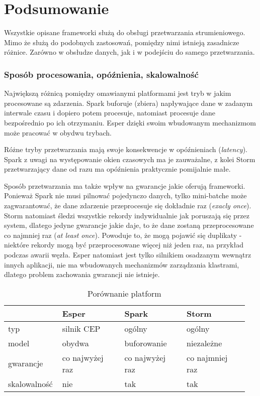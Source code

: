 \section{Podsumowanie}

Wszystkie opisane frameworki służą do obsługi przetwarzania strumieniowego.
Mimo że służą do podobnych zastosowań,
pomiędzy nimi istnieją zasadnicze różnice.
Zarówno w obsłudze danych,
jak i w podejściu do samego przetwarzania.

\subsubsection*{Sposób procesowania, opóźnienia, skalowalność}
Największą różnicą pomiędzy omawianymi platformami jest tryb w jakim procesowane są zdarzenia.
Spark buforuje (zbiera) napływające dane w zadanym interwale czasu i dopiero potem procesuje,
natomiast procesuje dane bezpośrednio po ich otrzymaniu.
Esper dzięki swoim wbudowanym mechanizmom może pracować w obydwu trybach.

Różne tryby przetwarzania mają swoje konsekwencje w opóźnieniach (\textit{latency}).
Spark z uwagi na występowanie okien czasowych ma je zauważalne,
z kolei Storm przetwarzający dane od razu ma opóźnienia praktycznie pomijalnie małe.

Sposób przetwarzania ma także wpływ na gwarancje jakie oferują frameworki.
Ponieważ Spark nie musi pilnować pojedynczo danych,
tylko mini-batche może zagwarantować,
że dane zdarzenie przeprocesuje się dokładnie raz (\textit{exacly once}).
Storm natomiast śledzi wszystkie rekordy indywidualnie jak poruszają się przez system,
dlatego jedyne gwarancje jakie daje,
to że dane zostaną przeprocesowane co najmniej raz (\textit{at least once}).
Powoduje to, że mogą pojawić się duplikaty - niektóre rekordy mogą być przeprocesowane więcej niż jeden raz,
na przykład podczas awarii węzła.
Esper natomiast jest tylko silnikiem osadzanym wewnątrz innych aplikacji,
nie ma wbudowanych mechanizmów zarządzania klastrami,
dlatego problem zachowania gwarancji nie istnieje.
\begin{table}[h]
  \label{tab:ModelComparison}
  \begin{tabular}{p{0.2\linewidth} | p{0.25\linewidth} | p{0.25\linewidth} | p{0.25\linewidth}}
    & Esper & Spark & Storm \\
    \hline
    typ & silnik CEP & ogólny & ogólny \\
    \hline
    model & obydwa & buforowanie & niezależne \\
    \hline
    gwarancje & co najwyżej raz & co najwyżej raz & co najmniej raz \\
    \hline
    skalowalność & nie & tak & tak \\
  \end{tabular}
  \caption{Porównanie platform}
\end{table}

